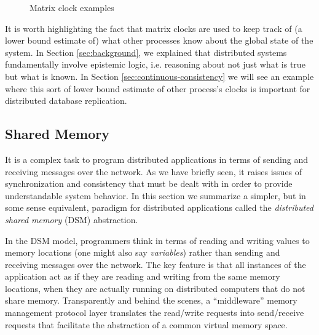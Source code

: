 \documentclass[]             %
{NASA}                       %
\theoremstyle{definition}
\begin{document}
\begin{figure}[p]
  \setlength\belowcaptionskip{5ex}
  \renewcommand*{\arraystretch}{0.9}

  \begin{subfigure}{1\textwidth}
    \centering
    
    \label{fig:message-latencies-matrix-a}
  \end{subfigure}

  \vspace{4ex}

  \begin{subfigure}{1\textwidth}
    
    \label{fig:message-latencies-matrix-b}
  \end{subfigure}

  \begin{subfigure}{1\textwidth}
    
    \label{fig:message-latencies-matrix-c}
  \end{subfigure}

  \caption{Matrix clock examples}
  \label{fig:message-latencies-matrix}
\end{figure}

\afterpage{\clearpage}


It is worth highlighting the fact that matrix clocks are used to keep
track of (a lower bound estimate of) what other processes know about
the global state of the system. In Section \ref{sec:background}, we
explained that distributed systems fundamentally involve epistemic
logic, i.e. reasoning about not just what is true but what is
known. In Section \ref{sec:continuous-consistency} we will see an
example where this sort of lower bound estimate of other process's
clocks is important for distributed database replication.

\subsection{Shared Memory}
It is a complex task to program distributed applications in terms of
sending and receiving messages over the network. As we have briefly
seen, it raises issues of synchronization and consistency that must be
dealt with in order to provide understandable system behavior. In this
section we summarize a simpler, but in some sense equivalent, paradigm
for distributed applications called the \emph{distributed shared
memory} (DSM) abstraction.

In the DSM model, programmers think in terms of reading and writing
values to memory locations (one might also say \emph{variables})
rather than sending and receiving messages over the network. The key
feature is that all instances of the application act as if they are
reading and writing from the same memory locations, when they are
actually running on distributed computers that do not share
memory. Transparently and behind the scenes, a ``middleware'' memory
management protocol layer translates the read/write requests into
send/receive requests that facilitate the abstraction of a common
virtual memory space.
\end{document}
